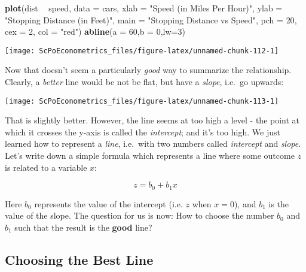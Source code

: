 \documentclass[]{book}
\newenvironment{Shaded}{\begin{snugshade}}{\end{snugshade}}
\newcommand{\KeywordTok}[1]{\textcolor[rgb]{0.13,0.29,0.53}{\textbf{#1}}}
\newcommand{\DataTypeTok}[1]{\textcolor[rgb]{0.13,0.29,0.53}{#1}}
\newcommand{\DecValTok}[1]{\textcolor[rgb]{0.00,0.00,0.81}{#1}}
\newcommand{\StringTok}[1]{\textcolor[rgb]{0.31,0.60,0.02}{#1}}
\newcommand{\OperatorTok}[1]{\textcolor[rgb]{0.81,0.36,0.00}{\textbf{#1}}}
\newcommand{\NormalTok}[1]{#1}
\begin{document}
\begin{Shaded}
\begin{Highlighting}[]
\KeywordTok{plot}\NormalTok{(dist }\OperatorTok{~}\StringTok{ }\NormalTok{speed, }\DataTypeTok{data =}\NormalTok{ cars,}
     \DataTypeTok{xlab =} \StringTok{"Speed (in Miles Per Hour)"}\NormalTok{,}
     \DataTypeTok{ylab =} \StringTok{"Stopping Distance (in Feet)"}\NormalTok{,}
     \DataTypeTok{main =} \StringTok{"Stopping Distance vs Speed"}\NormalTok{,}
     \DataTypeTok{pch  =} \DecValTok{20}\NormalTok{,}
     \DataTypeTok{cex  =} \DecValTok{2}\NormalTok{,}
     \DataTypeTok{col  =} \StringTok{"red"}\NormalTok{)}
\KeywordTok{abline}\NormalTok{(}\DataTypeTok{a =} \DecValTok{60}\NormalTok{,}\DataTypeTok{b =} \DecValTok{0}\NormalTok{,}\DataTypeTok{lw=}\DecValTok{3}\NormalTok{)}
\end{Highlighting}
\end{Shaded}

\begin{center}\texttt{[image: ScPoEconometrics\_files/figure-latex/unnamed-chunk-112-1]} \end{center}

Now that doesn't seem a particularly \emph{good} way to summarize the
relationship. Clearly, a \emph{better} line would be not be flat, but
have a \emph{slope}, i.e.~go upwards:

\begin{center}\texttt{[image: ScPoEconometrics\_files/figure-latex/unnamed-chunk-113-1]} \end{center}

That is slightly better. However, the line seems at too high a level -
the point at which it crosses the y-axis is called the \emph{intercept};
and it's too high. We just learned how to represent a \emph{line},
i.e.~with two numbers called \emph{intercept} and \emph{slope}. Let's
write down a simple formula which represents a line where some outcome
\(z\) is related to a variable \(x\):

\begin{equation}
z = b_0 + b_1 x \label{eq:bline}
\end{equation}

Here \(b_0\) represents the value of the intercept (i.e. \(z\) when
\(x=0\)), and \(b_1\) is the value of the slope. The question for us is
now: How to choose the number \(b_0\) and \(b_1\) such that the result
is the \textbf{good} line?

\subsection{Choosing the Best Line}\label{choosing-the-best-line}
\end{document}
